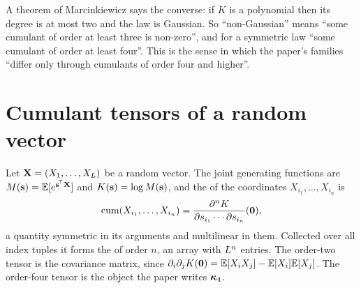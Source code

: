 A theorem of Marcinkiewicz says the converse: if $K$ is a polynomial then its degree
is at most two and the law is Gaussian. So ``non-Gaussian'' means ``some cumulant of
order at least three is non-zero'', and for a symmetric law ``some cumulant of order
at least four''. This is the sense in which the paper's families ``differ only through
cumulants of order four and higher''.


\section{Cumulant tensors of a random vector}
\label{sec:cumulant-tensors}

Let $\mathbf{X}=(X_1,\dots,X_{L})$ be a random vector. The joint generating
functions are $M(\mathbf{s})=\mathbb{E}[e^{\mathbf{s}^{\!\top}\mathbf{X}}]$ and $K(\mathbf{s})=\log M(\mathbf{s})$,
and the  of the coordinates $X_{i_1},\dots,X_{i_n}$ is
\begin{equation}
  \operatorname{cum}(X_{i_1},\dots,X_{i_n})=\frac{\partial^nK}{\partial s_{i_1}\cdots\partial s_{i_n}}(\mathbf{0}),
\end{equation}
a quantity symmetric in its arguments and multilinear in them. Collected over all
index tuples it forms the  of order $n$, an array with
$L^n$ entries. The order-two tensor is the covariance matrix, since
$\partial_i\partial_jK(\mathbf{0})=\mathbb{E}[X_iX_j]-\mathbb{E}[X_i]\mathbb{E}[X_j]$. The order-four tensor is
the object the paper writes $\bm{\kappa}_4$.

